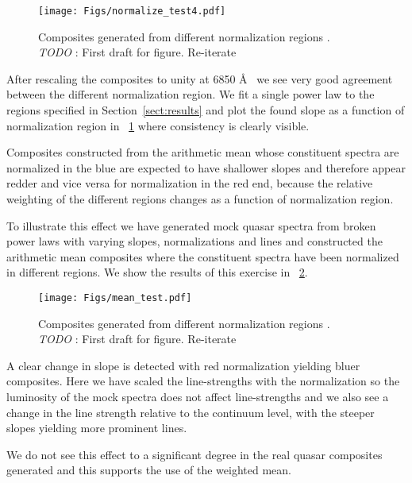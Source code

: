 \documentclass{aa}    %
\newcommand{\figref}[1]{\ref{fig:#1}}
\newcommand{\Fig}[1]{\figurename~\figref{#1}}
\newcommand{\fig}[1]{\Fig{#1}}
\newcommand{\figlabel}[1]{\label{fig:#1}}
\newcommand{\sectionname}{Section}
\newcommand{\Sect}[1]{\sectionname~\ref{sect:#1}}
\newcommand{\sect}[1]{\Sect{#1}}
\newcommand{\todo}[3]{{\color{#2}\emph{#1}: #3}}
\newcommand{\jstodo}[1]{\todo{ \\TODO }{red}{#1}}
\begin{document}
 \begin{figure}[hbtp]
   \centering
   \texttt{[image: Figs/normalize\_test4.pdf]}
   \caption[]{Composites generated from different normalization regions . \jstodo{First draft for figure. Re-iterate}}
  \figlabel{norm_test}
 \end{figure}


After rescaling the composites to unity at 6850 \AA~ we see very good agreement between the different normalization region. We fit a single power law to the regions specified in \sect{results} and plot the found slope as a function of normalization region in \fig{norm_test} where consistency is clearly visible. 

Composites constructed from the arithmetic mean whose constituent spectra are normalized in the blue are expected to have shallower slopes and therefore appear redder and vice versa for normalization in the red end, because the relative weighting of the different regions changes as a function of normalization region. 

To illustrate this effect we have generated mock quasar spectra from broken power laws with varying slopes, normalizations and lines and constructed the arithmetic mean composites where the constituent spectra have been normalized in different regions. We show the results of this exercise in \fig{mean_test}.


 \begin{figure}[hbtp]
   \centering
   \texttt{[image: Figs/mean\_test.pdf]}
   \caption[]{Composites generated from different normalization regions . \jstodo{First draft for figure. Re-iterate}}
  \figlabel{mean_test}
 \end{figure}


 A clear change in slope is detected with red normalization yielding bluer composites. Here we have scaled the line-strengths with the normalization so the luminosity of the mock spectra does not affect line-strengths and we also see a change in the line strength relative to the continuum level, with the steeper slopes yielding more prominent lines.
 
We do not see this effect to a significant degree in the real quasar composites generated and this supports the use of the weighted mean.
\end{document}
